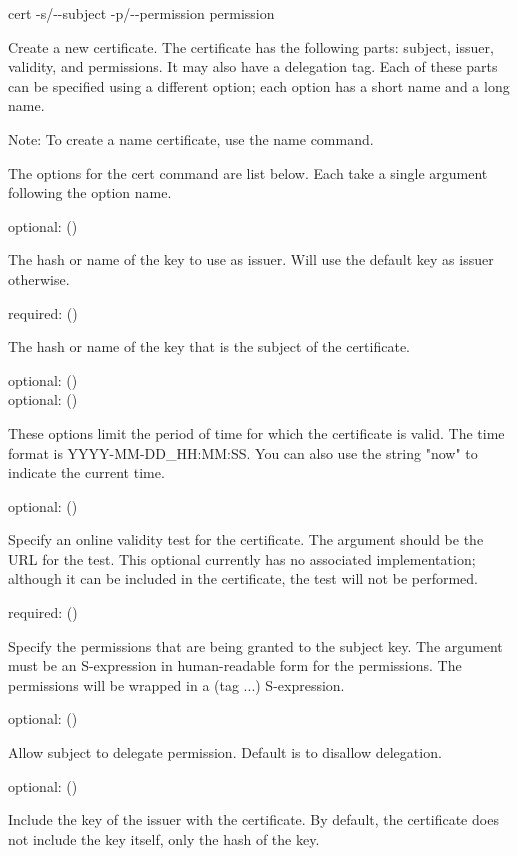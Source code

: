 \documentclass{howto}
\begin{document}
\begin{datadescni}{cert -s/-{}-subject -p/-{}-permission permission  } 

    Create a new certificate.  The certificate has the following
    parts: subject, issuer, validity, and permissions.  It may also
    have a delegation tag.  Each of these parts can be specified using
    a different option; each option has a short name and a long name.

    Note: To create a name certificate, use the name command.

    The options for the cert command are list below.  Each take a
    single argument following the option name.

    optional: \programopt{-} ()

    The hash or name of the key to use as issuer.  Will use the
    default key as issuer otherwise.

    required: \programopt{-} ()

    The hash or name of the key that is the subject of the
    certificate.

    optional: \programopt{-} () \\
    optional: \programopt{-} ()

    These options limit the period of time for which the certificate
    is valid.  The time format is YYYY-MM-DD_HH:MM:SS.  You can also
    use the string "now" to indicate the current time.

    optional: \programopt{-} ()

    Specify an online validity test for the certificate.  The argument
    should be the URL for the test.  This optional currently has no
    associated implementation; although it can be included in the
    certificate, the test will not be performed.

    required: \programopt{-} ()

    Specify the permissions that are being granted to the subject
    key.  The argument must be an S-expression in human-readable
    form for the permissions.  The permissions will be wrapped in a
    (tag ...) S-expression.

    optional: \programopt{-} ()

    Allow subject to delegate permission.  Default is to disallow
    delegation. 

    optional: \programopt{-} ()

    Include the key of the issuer with the certificate.  By default,
    the certificate does not include the key itself, only the hash of
    the key. 
\end{datadescni}
\end{document}
